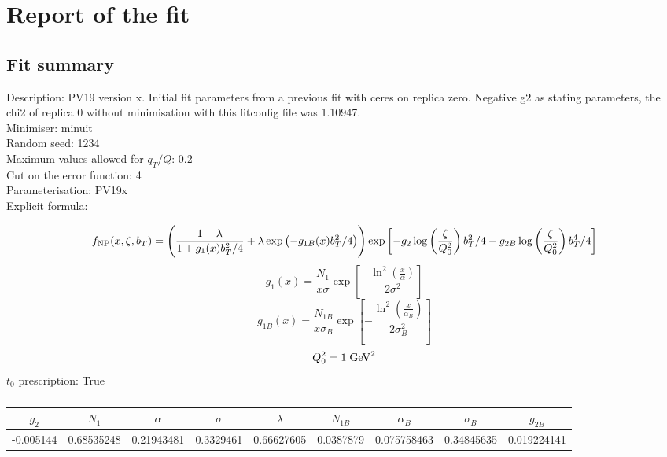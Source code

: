 \documentclass[
]{article}
\date{}
\begin{document}
\hypertarget{report-of-the-fit}{%
\section{Report of the fit}\label{report-of-the-fit}}

\hypertarget{fit-summary}{%
\subsection{Fit summary}\label{fit-summary}}

Description: PV19 version x. Initial fit parameters from a previous fit
with ceres on replica zero. Negative g2 as stating parameters, the chi2
of replica 0 without minimisation with this fitconfig file was
1.10947.\\
Minimiser: minuit\\
Random seed: 1234\\
Maximum values allowed for \(q_T / Q\): 0.2\\
Cut on the error function: 4\\
Parameterisation: PV19x\\
Explicit formula:

\[f_{\rm NP}(x,\zeta, b_T)= \Biggl(
\frac{1-\lambda}{1 + g_1(x) b_T^2/4} + \lambda \exp \left(-g_{1B}(x) b_T^2 / 4 \right)\Biggr) \exp\left[- g_2 \log\left(\frac{\zeta}{Q_0^2}\right) b_T^2/4 - g_{2B} \log\left(\frac{\zeta}{Q_0^2}\right) b_T^4/4 \right]\]\[g_1(x) = \frac{N_1}{x\sigma} \exp\left[ - \frac{\ln^2\left(\frac{x}{\alpha}\right)}{2 \sigma^2} \right]\]\[g_{1B}(x) = \frac{N_{1B}}{x\sigma_B} \exp\left[ - \frac{\ln^2\left(\frac{x}{\alpha_B}\right)}{2 \sigma_B^2} \right]\]\[Q_0^2 = 1\;{\rm GeV}^2\]
\(t_0\) prescription: True

\begin{table}[h]

\centering

\begin{tabular}{|c|c|c|c|c|c|c|c|c|} \hline

\textbf{\(g_2\)} & \textbf{\(N_1\)} & \textbf{\(\alpha\)} & \textbf{\(\sigma\)} & \textbf{\(\lambda\)} & \textbf{\(N_{1B}\)} & \textbf{\(\alpha_B\)} & \textbf{\(\sigma_B\)} & \textbf{\(g_{2B}\)} \\ \hline

-0.005144 & 0.68535248 & 0.21943481 & 0.3329461 & 0.66627605 & 0.0387879 & 0.075758463 & 0.34845635 & 0.019224141 \\ \hline

\end{tabular}

\caption{}

\end{table}
\end{document}
